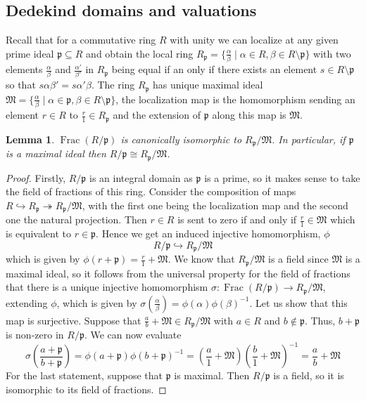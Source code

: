 \documentclass{article}
\DeclareMathOperator{\Frac}{Frac}
\newtheorem{lemma}{Lemma}[section]
\newcommand{\mfrak}[1]{\mathfrak{#1}}
\numberwithin{equation}{section}
\begin{document}
\subsection{Dedekind domains and valuations}


Recall that for a commutative ring $R$ with unity we can localize at any given prime ideal $\mfrak p \subseteq R$ and obtain the local ring $R_\mfrak p = \{\frac{\alpha}{\beta} \mid \alpha \in R, \beta \in R \setminus \mfrak p \}$ with two elements $\frac{\alpha}{\beta}$ and  $\frac{\alpha'}{\beta'}$ in $R_\mfrak p$ being equal if an only if there exists an element $s \in R \setminus \mfrak p$ so that $s\alpha \beta' = s\alpha' \beta$. The ring $R_\mfrak p$ has unique maximal ideal $\mfrak M =  \{\frac{\alpha}{\beta} \mid \alpha \in \mfrak p, \beta \in R\setminus \mfrak p \}$, the localization map is the homomorphism sending an element $r \in R$ to $\frac{r}{1} \in R_\mfrak p$ and the extension of $\mfrak p$ along this map is $\mfrak M$.

\begin{lemma} \label{lem: Canonical localization isomorphism}
    $\Frac(R / \mfrak p)$ is canonically isomorphic to $R_\mfrak p / \mfrak M$. In particular, if $\mfrak p$ is a maximal ideal then $R / \mfrak p \cong R_\mfrak p / \mfrak M$.
\end{lemma}
\begin{proof}
    Firstly, $R / \mfrak p$ is an integral domain as $\mfrak p$ is a prime, so it makes sense to take the field of fractions of this ring. Consider the composition of maps $R \hookrightarrow R_\mfrak p \twoheadrightarrow R_\mfrak p / \mfrak M$, with the first one being the localization map and the second one the natural projection. Then $r \in R$ is sent to zero if and only if $\frac{r}{1} \in \mfrak M$ which is equivalent to $r \in \mfrak p$. Hence we get an induced injective homomorphism, $\phi$
    $$R / \mfrak p \hookrightarrow R_\mfrak p / \mfrak M$$
    which is given by $\phi(r + \mfrak p) = \frac{r}{1} + \mfrak M$. We know that $R_\mfrak p / \mfrak M$ is a field since $\mfrak M$ is a maximal ideal, so it follows from the universal property for the field of fractions that there is a unique injective homomorphism $\sigma : \Frac(R / \mfrak p) \to R_\mfrak p / \mfrak M$, extending $\phi$, which is given by $\sigma(\frac{\alpha}{\beta}) = \phi(\alpha)\phi(\beta)^{-1}$. Let us show that this map is surjective. Suppose that $\frac{a}{b} + \mfrak M  \in R_\mfrak p / \mfrak M$ with $a \in R$ and $b \notin \mfrak p$. Thus, $b + \mfrak p$ is non-zero in $R / \mfrak p$. We can now evaluate
    $$\sigma(\frac{a + \mfrak p}{b + \mfrak p}) = \phi(a + \mfrak p)\phi(b + \mfrak p)^{-1} = (\frac{a}{1} + \mfrak M) (\frac{b}{1} + \mfrak M)^{-1} = \frac{a}{b} + \mfrak M$$
    For the last statement, suppose that $\mfrak p$ is maximal. Then $R / \mfrak p$ is a field, so it is isomorphic to its field of fractions.
\end{proof}
\end{document}

